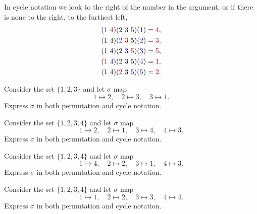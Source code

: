 \documentclass{ximera}
\begin{document}
\begin{example}
  In cycle notation we look to the right of the number in the
  argument, or if there is none to the right, to the furthest left,
  \begin{align*}
    (\textcolor{blue!60!black}1 \ \textcolor{red!60!black}4) (2 \ 3 \ 5)(\textcolor{blue!60!black}1) &= \textcolor{red!60!black}4, \\
    (1 \ 4) (\textcolor{blue!60!black}2 \ \textcolor{red!60!black}3 \ 5)(\textcolor{blue!60!black}2) &= \textcolor{red!60!black}3, \\
    (1 \ 4) (2 \ \textcolor{blue!60!black}3 \ \textcolor{red!60!black}5)(\textcolor{blue!60!black}3) &= \textcolor{red!60!black}5, \\
    (\textcolor{red!60!black}1 \ \textcolor{blue!60!black}4) (2 \ 3 \ 5)(\textcolor{blue!60!black}4) &= \textcolor{red!60!black}1, \\
    (1 \ 4) (\textcolor{red!60!black}2 \ 3 \ \textcolor{blue!60!black}5)(\textcolor{blue!60!black}5) &= \textcolor{red!60!black}2.
  \end{align*}
\end{example}



\begin{exercise}
  Consider the set $\{1,2,3\}$ and let $\sigma$ map
  \[
  1 \mapsto 2, \quad 2 \mapsto 3, \quad 3\mapsto 1.
  \]
  Express $\sigma$ in both permutation and cycle notation.
\end{exercise}



\begin{exercise}
  Consider the set $\{1,2,3,4\}$ and let $\sigma$ map
  \[
  1 \mapsto 2, \quad 2 \mapsto 1, \quad 3\mapsto 4, \quad 4\mapsto 3.
  \]
  Express $\sigma$ in both permutation and cycle notation.
\end{exercise}

\begin{exercise}
  Consider the set $\{1,2,3,4\}$ and let $\sigma$ map
  \[
  1 \mapsto 4, \quad 2 \mapsto 2, \quad 3\mapsto 1, \quad 4\mapsto 3.
  \]
  Express $\sigma$ in both permutation and cycle notation.
\end{exercise}

\begin{exercise}
  Consider the set $\{1,2,3,4\}$ and let $\sigma$ map
  \[
  1 \mapsto 1, \quad 2 \mapsto 2, \quad 3\mapsto 3, \quad 4\mapsto 4.
  \]
  Express $\sigma$ in both permutation and cycle notation.
\end{exercise}
\end{document}
